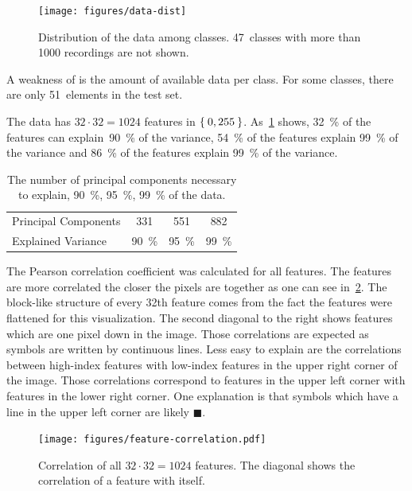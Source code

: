 \begin{figure}[h]
    \centering
    \texttt{[image: figures/data-dist]}
    \caption{Distribution of the data among classes. 47~classes with
             more than \num{1000} recordings are not shown.}
    \label{fig:class-data-distribution}
\end{figure}

A weakness of \dbNameVersion{} is the amount of available data per class. For
some classes, there are only 51~elements in the test set.

The data has $32\cdot 32 = 1024$ features in $\Set{0, 255}$.
As~\cref{table:pca-explained-variance} shows, \SI{32}{\percent} of the features
can explain~\SI{90}{\percent} of the variance, \SI{54}{\percent} of the
features explain \SI{99}{\percent} of the variance and \SI{86}{\percent} of the
features explain \SI{99}{\percent} of the variance.

\begin{table}[h]
    \centering
    \begin{tabular}{lccc}
    \toprule
    Principal Components &  331              & 551               & 882  \\
    Explained Variance   & \SI{90}{\percent} & \SI{95}{\percent} & \SI{99}{\percent} \\
    \bottomrule
    \end{tabular}
    \caption{The number of principal components necessary to explain,
             \SI{90}{\percent}, \SI{95}{\percent}, \SI{99}{\percent}
             of the data.}
    \label{table:pca-explained-variance}
\end{table}

The Pearson correlation coefficient was calculated for all features. The
features are more correlated the closer the pixels are together as one can see
in~\cref{fig:feature-correlation}. The block-like structure of every 32th
feature comes from the fact the features were flattened for this visualization.
The second diagonal to the right shows features which are one pixel down in the
image. Those correlations are expected as symbols are written by continuous
lines. Less easy to explain are the correlations between high-index
features with low-index features in the upper right corner of the image.
Those correlations correspond to features in the upper left corner with
features in the lower right corner. One explanation is that symbols which have
a line in the upper left corner are likely $\blacksquare$.

\begin{figure}[h]
    \centering
    \texttt{[image: figures/feature-correlation.pdf]}
    \caption{Correlation of all $32 \cdot 32 = 1024$ features. The diagonal
             shows the correlation of a feature with itself.}
    \label{fig:feature-correlation}
\end{figure}


